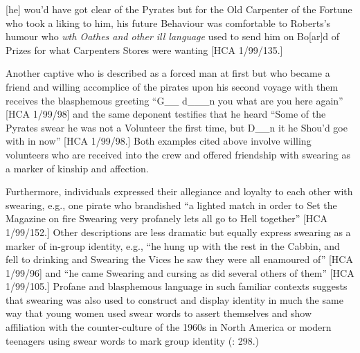 [he] wou’d have got clear of the Pyrates but for the Old Carpenter of the Fortune who took a liking to him, his future Behaviour was comfortable to Roberts’s humour who \textit{wth Oathes and other ill language} used to send him on Bo[ar]d of Prizes for what Carpenters Stores were wanting [HCA 1/99/135.] 

Another captive who is described as a forced man at first but who became a friend and willing accomplice of the pirates upon his second voyage with them receives the blasphemous greeting “G\_\_ d\_\_\_n you what are you here again” [HCA 1/99/98] and the same deponent testifies that he heard “Some of the Pyrates swear he was not a Volunteer the first time, but D\_\_n it he Shou’d goe with in now” [HCA 1/99/98.] Both examples cited above involve willing volunteers who are received into the crew and offered friendship with swearing as a marker of kinship and affection. 

Furthermore, individuals expressed their allegiance and loyalty to each other with swearing, e.g., one pirate who brandished “a lighted match in order to Set the Magazine on fire Swearing very profanely lets all go to Hell together” [HCA 1/99/152.] Other descriptions are less dramatic but equally express swearing as a marker of in-group identity, e.g., “he hung up with the rest in the Cabbin, and fell to drinking and Swearing the Vices he saw they were all enamoured of” [HCA 1/99/96] and “he came Swearing and cursing as did several others of them” [HCA 1/99/105.] Profane and blasphemous language in such familiar contexts suggests that swearing was also used to construct and display identity in much the same way that young women used swear words to assert themselves and show affiliation with the counter-culture of the 1960s in North America \citep[60]{Carlisle2009} or modern teenagers using swear words to mark group identity (\citealt{Stapleton2010}: 298.) 

